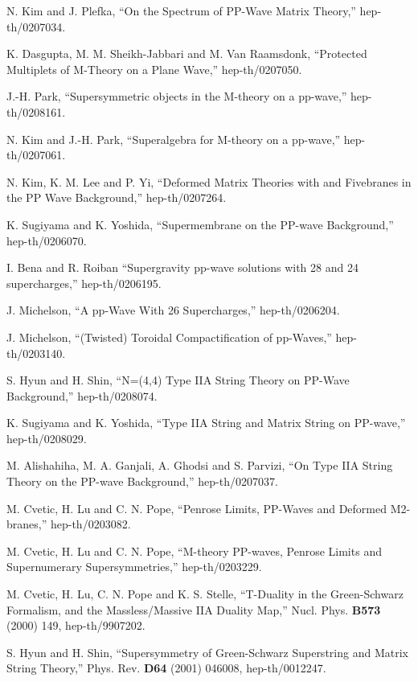 \documentclass[a4paper,12pt]{article}
\begin{document}
\begin{thebibliography}{99}
 N. Kim and J. Plefka, ``On the Spectrum of PP-Wave
  Matrix Theory,'' hep-th/0207034.

 K. Dasgupta, M. M. Sheikh-Jabbari and M. Van
  Raamsdonk, ``Protected Multiplets of M-Theory on a Plane Wave,''
  hep-th/0207050.

 J.-H. Park, ``Supersymmetric objects in the M-theory 
on a pp-wave,'' hep-th/0208161.
 
 N. Kim and J.-H. Park, ``Superalgebra for M-theory on
  a pp-wave,'' hep-th/0207061.

 N. Kim, K. M. Lee and P. Yi, ``Deformed Matrix
  Theories with \coordHE{} and Fivebranes in the PP Wave
  Background,'' hep-th/0207264.

 K. Sugiyama and K. Yoshida, ``Supermembrane on the
  PP-wave Background,'' hep-th/0206070.

 I. Bena and R. Roiban ``Supergravity pp-wave
  solutions with 28 and 24 supercharges,'' hep-th/0206195.

 J. Michelson, ``A pp-Wave With 26 Supercharges,''
  hep-th/0206204.

 J. Michelson, ``(Twisted) Toroidal Compactification
  of pp-Waves,'' hep-th/0203140.
  
 S. Hyun and H. Shin, ``N=(4,4) Type IIA String Theory
  on PP-Wave Background,'' hep-th/0208074.

 K. Sugiyama and K. Yoshida, ``Type IIA String and
  Matrix String on PP-wave,'' hep-th/0208029.
  
 M. Alishahiha, M. A. Ganjali, A. Ghodsi and S.
  Parvizi, ``On Type IIA String Theory on the PP-wave Background,''
  hep-th/0207037.
 
 M. Cvetic, H. Lu and C. N. Pope, ``Penrose Limits,
  PP-Waves and Deformed M2-branes,'' hep-th/0203082.
  
 M. Cvetic, H. Lu and C. N. Pope, ``M-theory PP-waves,
  Penrose Limits and Supernumerary Supersymmetries,'' hep-th/0203229.

 M. Cvetic, H. Lu, C. N. Pope and K. S. Stelle,
  ``T-Duality in the Green-Schwarz Formalism, and the Massless/Massive
  IIA Duality Map,'' Nucl. Phys. {\bf B573} (2000) 149,
  hep-th/9907202.
  
 S. Hyun and H. Shin, ``Supersymmetry of Green-Schwarz
  Superstring and Matrix String Theory,'' Phys. Rev. {\bf D64} (2001)
  046008, hep-th/0012247.
  

\end{thebibliography}
\end{document}
